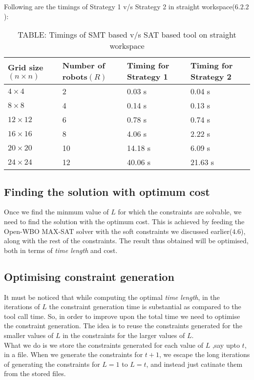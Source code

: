 \documentclass{article}[11pt]
\begin{document}
			Following are the timings of Strategy 1 v/s Strategy 2 in straight workspace($6.2.2$):
				\begin{table}[h!]
				\centering
				\begin{tabular}{|| p{2cm} | p{2cm} | p{2cm} | p{2cm} ||} 
				 \hline\hline
				 Grid size$(n \times n)$ & Number of robots$(R)$ & Timing for Strategy 1 & Timing for Strategy 2 \\ [0.5ex] 
				 \hline\hline
				 $4 \times 4$ & 2 & 0.03 s & 0.04 s \\ 
				 $8 \times 8$ & 4 & 0.14 s & 0.13 s \\
				 $12 \times 12$ & 6 & 0.78 s & 0.74 s \\
				 $16 \times 16$ & 8 & 4.06 s & 2.22 s \\
				 $20 \times 20$ & 10 & 14.18 s & 6.09 s \\
				 $24 \times 24$ & 12 & 40.06 s & 21.63 s  \\ [1ex]
				 \hline
				\end{tabular}
				\caption*{TABLE: Timings of SMT based v/s SAT based tool on straight workspace}
				\end{table}


		\subsection{Finding the solution with optimum cost}
			Once we find the minmum value of $L$ for which the constraints are solvable, we need to find the solution with the optimum cost. This is achieved by feeding the Open-WBO MAX-SAT solver with the soft constraints we discussed earlier($4.6$), along with the rest of the constraints. The result thus obtained will be optimised, both in terms of \textit{time length} and cost.

		\subsection{Optimising constraint generation}
			It must be noticed that while computing the optimal \textit{time length}, in the iterations of $L$ the constraint generation time is substantial as compared to the tool call time. So, in order to improve upon the total time we need to optimise the constraint generation. The idea is to reuse the constraints generated for the smaller values of $L$ in the constraints for the larger values of $L$.\\

			What we do is we store the constraints generated for each value of $L$ ,say upto $t$, in a file. When we generate the constraints for $t+1$, we escape the long iterations of generating the constraints for $L=1$ to $L=t$, and instead just catinate them from the stored files.
\end{document}
